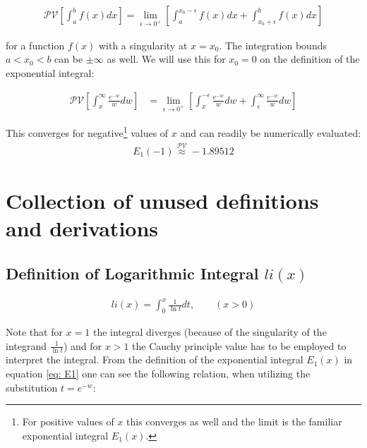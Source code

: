 \documentclass[bibliography=totocnumbered]{scrartcl}
\newcommand{\assume}[1][\text{MISSING PARAMETER}]{,\qquad\left(#1\right)}
\begin{document}
	\begin{gather}
		\mathcal{PV}\left[\int_{a}^{b}f\left(x\right)dx\right]=\lim_{\epsilon\to{}0^{+}}\left[\int_{a}^{x_0-\epsilon}f\left(x\right)dx+\int_{x_0+\epsilon}^{b}f\left(x\right)dx\right]
	\end{gather}

	for a function $f\left(x\right)$ with a singularity at $x=x_0$. The integration bounds $a<x_0<b$ can be $\pm\infty$ as well. We will use this for $x_0=0$ on the definition of the exponential integral:

	\begin{align}
		\mathcal{PV}\left[\int_{x}^{\infty}\frac{e^{-w}}{w}dw\right]&=\lim_{\epsilon\to{}0^{+}}\left[\int_{x}^{-\epsilon}\frac{e^{-w}}{w}dw+\int_{\epsilon}^{\infty}\frac{e^{-w}}{w}dw\right]
	\end{align}

	This converges for negative\footnote{For positive values of $x$ this converges as well and the limit is the familiar exponential integral $E_1\left(x\right)$.} values of $x$ and can readily be numerically evaluated:
	\begin{gather}
		E_1\left(-1\right)\overset{\mathcal{PV}}{\approx}-1.89512
	\end{gather}

	\clearpage
	\printbibliography
	\clearpage
	\appendix

	\section{Collection of unused definitions and derivations}

		\subsection{Definition of Logarithmic Integral $li\left(x\right)$}
		\label{appsubsec: li}

			\begin{gather}
				li\left(x\right)=\int_{0}^{x}\frac{1}{\ln{t}}dt\assume[x>0]\label{eq: li}
			\end{gather}

			Note that for $x=1$ the integral diverges (because of the singularity of the integrand $\frac{1}{\ln{t}}$) and for $x>1$ the Cauchy principle value has to be employed to interpret the integral. From the definition of the exponential integral $E_1\left(x\right)$ in equation \eqref{eq: E1} one can see the following relation, when utilizing the substitution $t=e^{-w}$:
\end{document}
